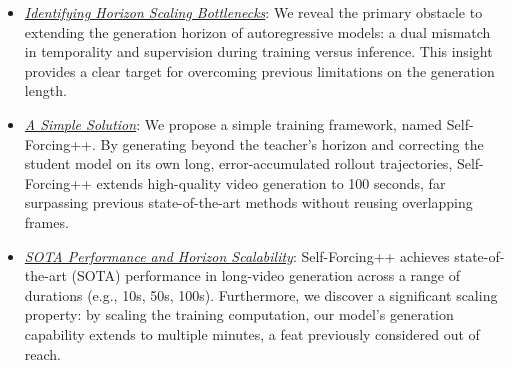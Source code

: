 \begin{itemize}[leftmargin=*]
\item \underline{\textit{Identifying Horizon Scaling Bottlenecks}}: We reveal the primary obstacle to extending the generation horizon of autoregressive models: a dual mismatch in temporality and supervision during training versus inference. This insight provides a clear target for overcoming previous limitations on the generation length.

\item \underline{\textit{A Simple Solution}}: We propose a simple training framework, named Self-Forcing++. By generating beyond the teacher's horizon and correcting the student model on its own long, error-accumulated rollout trajectories, Self-Forcing++ extends high-quality video generation to 100 seconds, far surpassing previous state-of-the-art methods without reusing overlapping frames.

\item \underline{\textit{SOTA Performance and Horizon Scalability}}: Self-Forcing++ achieves state-of-the-art (SOTA) performance in long-video generation across a range of durations (e.g., 10s, 50s, 100s). Furthermore, we discover a significant scaling property: by scaling the training computation, our model's generation capability extends to multiple minutes, a feat previously considered out of reach.
\end{itemize}